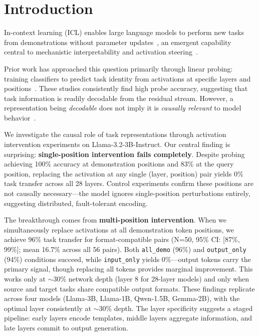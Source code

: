 \documentclass[sigconf,anonymous]{acmart}
\begin{document}


\maketitle

\section{Introduction}
\label{sec:intro}

In-context learning (ICL) enables large language models to perform new tasks from demonstrations without parameter updates~\cite{brown2020language,garg2022can}, an emergent capability~\cite{wei2022emergent} central to mechanistic interpretability and activation steering~\cite{turner2023activation}.

Prior work has approached this question primarily through linear probing: training classifiers to predict task identity from activations at specific layers and positions~\cite{todd2023function,hendel2023context}. These studies consistently find high probe accuracy, suggesting that task information is readily decodable from the residual stream. However, a representation being \emph{decodable} does not imply it is \emph{causally relevant} to model behavior~\cite{ravfogel2020null,elazar2021amnesic}.

We investigate the causal role of task representations through activation intervention experiments on Llama-3.2-3B-Instruct. Our central finding is surprising: \textbf{single-position intervention fails completely}. Despite probing achieving 100\% accuracy at demonstration positions and 83\% at the query position, replacing the activation at any single (layer, position) pair yields 0\% task transfer across all 28 layers. Control experiments confirm these positions are not causally necessary---the model ignores single-position perturbations entirely, suggesting distributed, fault-tolerant encoding.

The breakthrough comes from \textbf{multi-position intervention}. When we simultaneously replace activations at all demonstration token positions, we achieve 96\% task transfer for format-compatible pairs (N=50, 95\% CI: [87\%, 99\%]; mean 16.7\% across all 56 pairs). Both \texttt{all\_demo} (96\%) and \texttt{output\_only} (94\%) conditions succeed, while \texttt{input\_only} yields 0\%---output tokens carry the primary signal, though replacing all tokens provides marginal improvement. This works only at $\sim$30\% network depth (layer 8 for 28-layer models) and only when source and target tasks share compatible output formats. These findings replicate across four models (Llama-3B, Llama-1B, Qwen-1.5B, Gemma-2B), with the optimal layer consistently at $\sim$30\% depth. The layer specificity suggests a staged pipeline: early layers encode templates, middle layers aggregate information, and late layers commit to output generation.
\end{document}
